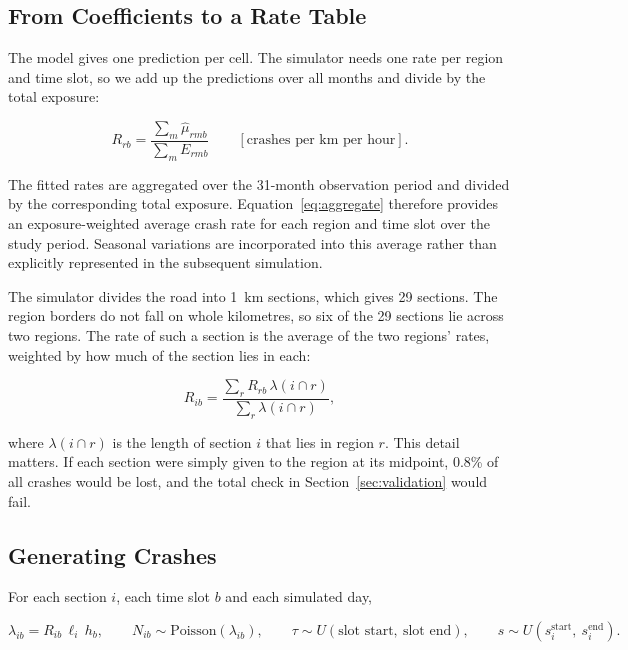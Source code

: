 \documentclass[11pt]{article}
\begin{document}
\subsection{From Coefficients to a Rate Table}

The model gives one prediction per cell. The simulator needs one rate per
region and time slot, so we add up the predictions over all months and divide
by the total exposure:

\begin{equation}
R_{rb}=\frac{\sum_m \hat{\mu}_{rmb}}{\sum_m E_{rmb}}
\qquad[\text{crashes per km per hour}].
\label{eq:aggregate}
\end{equation}


The fitted rates are aggregated over the 31-month observation period and divided by the corresponding total exposure. Equation~\eqref{eq:aggregate} therefore provides an exposure-weighted average crash rate for each region and time slot over the study period. Seasonal variations are incorporated into this average rather than explicitly represented in the subsequent simulation.


The simulator divides the road into 1~km sections, which gives 29 sections. The
region borders do not fall on whole kilometres, so six of the 29 sections lie
across two regions. The rate of such a section is the average of the two
regions' rates, weighted by how much of the section lies in each:

\begin{equation}
R_{ib}=\frac{\sum_r R_{rb}\,\lambda(i\cap r)}{\sum_r \lambda(i\cap r)},
\label{eq:blend}
\end{equation}

where $\lambda(i\cap r)$ is the length of section $i$ that lies in region $r$.
This detail matters. If each section were simply given to the region at its
midpoint, 0.8\% of all crashes would be lost, and the total check in
Section~\ref{sec:validation} would fail.

\subsection{Generating Crashes}

For each section $i$, each time slot $b$ and each simulated day,

\begin{equation}
\lambda_{ib}=R_{ib}\,\ell_i\,h_b,\qquad
N_{ib}\sim\mathrm{Poisson}(\lambda_{ib}),\qquad
\tau\sim U(\text{slot start},\ \text{slot end}),\qquad
s\sim U(s_i^{\text{start}},\ s_i^{\text{end}}).
\label{eq:generate}
\end{equation}
\end{document}
